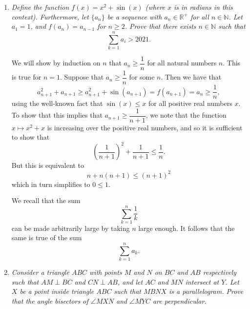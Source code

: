 \documentclass{article}
\begin{document}
\begin{enumerate}[1.]
\vspace{24pt}
\item %
{\itshape Define the function $f(x) = x^2 + \sin(x)$ (where $x$ is in radians in this context). Furthermore, let $\{a_n\}$ be a sequence with $a_n \in \mathbb{R}^+$ for all $n \in \mathbb{N}$. Let $a_1 = 1$, and $f(a_n) = a_{n - 1}$ for $n \ge 2$. Prove that there exists $n \in \mathbb{N}$ such that 
$$\sum_{k = 1}^n a_i > 2021.$$}

We will show by induction on $n$ that $a_n \geq \dfrac{1}{n}$ for all natural numbers $n$. This is true for $n = 1$. Suppose that $a_n \geq \dfrac{1}{n}$ for some $n$. Then we have that
\[
	a_{n + 1}^2 + a_{n + 1} \geq a_{n + 1}^2 + \sin(a_{n + 1}) = f(a_{n + 1}) = a_n \geq \dfrac{1}{n},
\]
using the well-known fact that $\sin(x) \leq x$ for all positive real numbers $x$. To show that this implies that $a_{n + 1} \geq \dfrac{1}{n + 1}$, we note that the function $x \mapsto x^2 + x$ is increasing over the positive real numbers, and so it is sufficient to show that
\[
	\left(\frac{1}{n + 1}\right)^2 + \frac{1}{n + 1} \leq \dfrac{1}{n}.
\]
But this is equivalent to
\[
	n + n(n + 1) \leq (n + 1)^2
\]
which in turn simplifies to $0 \leq 1$.

We recall that the sum
\[
	\sum_{k=1}^{n} \frac{1}{k}
\]
can be made arbitrarily large by taking $n$ large enough. It follows that the same is true of the sum
\[
	\sum_{k=1}^{n} a_k.	
\]



\vspace{24pt}
\item %
{\itshape Consider a triangle $ABC$ with points $M$ and $N$ on $BC$ and $AB$ respectively such that $AM \perp BC$ and $CN \perp AB$, and let $AC$ and $MN$ intersect at $Y$.
Let $X$ be a point inside triangle $ABC$ such that $MBNX$ is a parallelogram.
Prove that the angle bisectors of $\angle MXN$ and $\angle MYC$ are perpendicular.}


\end{enumerate}
\end{document}
